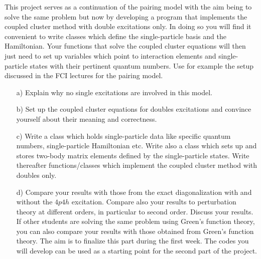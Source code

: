 \begin{prob}\label{problem:prob8.6}
This project serves as a continuation
of the pairing model with the aim being to solve the same problem but
now by developing a program that implements the coupled cluster method
with double excitations only. In doing so you will find it convenient
to write classes which define the single-particle basis and the
Hamiltonian. Your functions that solve the coupled cluster equations
will then just need to set up variables which point to interaction
elements and single-particle states with their pertinent quantum
numbers. Use for example the setup discussed in the FCI lectures for
the pairing model.

\begin{enumerate}

\item[a)]
Explain why no single excitations are involved in this model.


\item[b)]
Set up the coupled cluster equations for doubles excitations and convince yourself about their
meaning and correctness.

\item[c)]
Write a class which holds
single-particle data like specific quantum numbers, single-particle
Hamiltonian etc. Write also a class which sets up and stores two-body
matrix elements defined by the single-particle states.  Write
thereafter functions/classes which implement the coupled cluster
method with doubles only.


\item[d)]
Compare your results with
those from the exact diagonalization with and without the $4p4h$
excitation. Compare also your results to perturbation theory at
different orders, in particular to second order. Discuss your results.
If other students are solving the same problem using Green's function
theory, you can also compare your results with those obtained from
Green's function theory. The aim is to finalize this part during the
first week. The codes you will develop can be used as a starting point
for the second part of the project.
\end{enumerate}
\end{prob}

